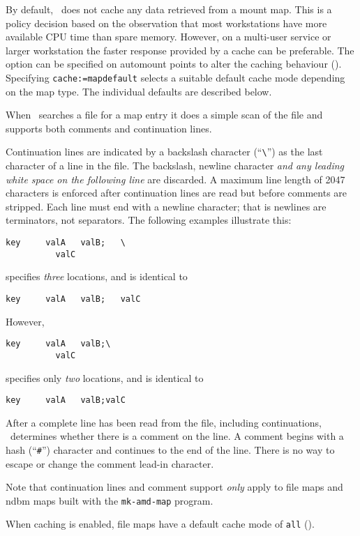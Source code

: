 By default, \amd\ does not cache any data retrieved from a mount map.
This is a policy decision based on the observation that most workstations
have more available CPU time than spare memory.
However, on a multi-user service or larger workstation the faster
response provided by a cache can be preferable.  The 
option can be specified on automount points to alter the
caching behaviour (\see {}).
Specifying {\tt cache:=mapdefault} selects a suitable default
cache mode depending on the map type.  The individual defaults
are described below.

When \amd\ searches a file for a map entry it does a simple scan of the file
and supports both comments and continuation lines.

Continuation lines are indicated by a backslash character (``{\verb+\+}'') as
the last character of a line in the file.  The backslash, newline character
{\em and any leading white space on the following line} are discarded.  A maximum
line length of 2047 characters is enforced after continuation lines are read
but before comments are stripped.  Each line must end with
a newline character; that is newlines are terminators, not separators.
The following examples illustrate this:
\begin{verbatim}
key     valA   valB;   \
          valC
\end{verbatim}
specifies {\em three} locations, and is identical to
\begin{verbatim}
key     valA   valB;   valC
\end{verbatim}
However,
\begin{verbatim}
key     valA   valB;\
          valC
\end{verbatim}
specifies only {\em two} locations, and is identical to
\begin{verbatim}
key     valA   valB;valC
\end{verbatim}

After a complete line has been read from the file, including continuations,
\amd\ determines whether there is a comment on the line.
A comment begins with a hash (``{\tt \#}'') character and continues to the
end of the line.
There is no way to escape or change the comment lead-in character.

Note that continuation lines and comment support {\em only} apply to
file maps and ndbm maps built with the {\tt mk-amd-map} program.

When caching is enabled, file maps have a default cache mode of {\tt all} (\see {}).


